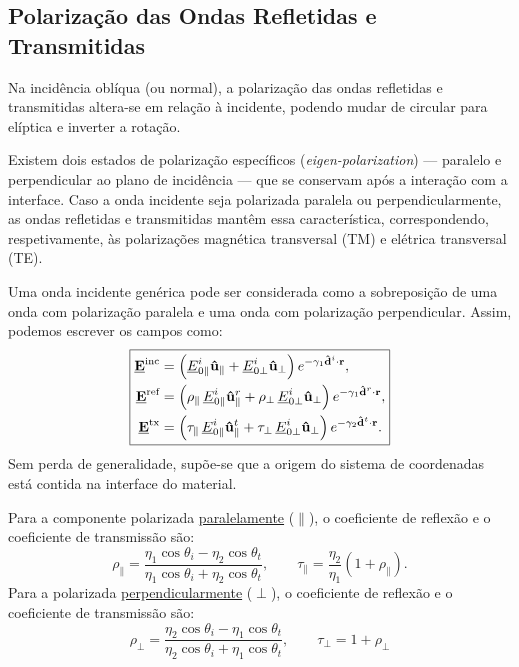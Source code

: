 \subsection{Polarização das Ondas Refletidas e Transmitidas}

Na incidência oblíqua (ou normal), a polarização das ondas refletidas e transmitidas altera-se em relação à incidente, podendo mudar de circular para elíptica e inverter a rotação.

Existem dois estados de polarização específicos (\textit{eigen-polarization}) --- paralelo e perpendicular ao plano de incidência --- que se conservam após a interação com a interface. Caso a onda incidente seja polarizada paralela ou perpendicularmente, as ondas refletidas e transmitidas mantêm essa característica, correspondendo, respetivamente, às polarizações magnética transversal (TM) e elétrica transversal (TE).

Uma onda incidente genérica pode ser considerada como a sobreposição de uma onda com polarização paralela e uma onda com polarização perpendicular. Assim, podemos escrever os campos como:
\begin{equation}
    \boxed{%
        \begin{aligned}
            \mathbf{\underline{E}}^{\text{inc}} &= \left( \underline{E}_{0\parallel}^i \mathbf{\hat{u}}_{\parallel} + \underline{E}_{0\perp}^i \mathbf{\hat{u}}_{\perp} \right) e^{-\gamma_1 \mathbf{\hat{d}}^i \cdot \mathbf{r}}, \\
            \mathbf{\underline{E}}^{\text{ref}} &= \left( \rho_{\parallel}\, \underline{E}_{0\parallel}^i \mathbf{\hat{u}}^{r}_{\parallel} + \rho_{\perp}\, \underline{E}_{0\perp}^i \mathbf{\hat{u}}_{\perp} \right) e^{-\gamma_1 \mathbf{\hat{d}}^r \cdot \mathbf{r}}, \\
            \mathbf{\underline{E}}^{\text{tx}} &= \left( \tau_{\parallel}\, \underline{E}_{0\parallel}^i \mathbf{\hat{u}}^{t}_{\parallel} + \tau_{\perp}\, \underline{E}_{0\perp}^i \mathbf{\hat{u}}_{\perp} \right) e^{-\gamma_2 \mathbf{\hat{d}}^t \cdot \mathbf{r}}.
        \end{aligned}
    }
\end{equation}
Sem perda de generalidade, supõe-se que a origem do sistema de coordenadas está contida na interface do material.

Para a componente polarizada \underline{paralelamente} ($\parallel$), o coeficiente de reflexão e o coeficiente de transmissão são:
\begin{equation}
    \rho_{\parallel} = \frac{\eta_1 \cos \theta_i - \eta_2 \cos \theta_t}{\eta_1 \cos \theta_i + \eta_2 \cos \theta_t},
    \qquad
    \tau_{\parallel} = \frac{\eta_2}{\eta_1} (1 + \rho_{\parallel}).
\end{equation}
Para a polarizada \underline{perpendicularmente} ($\perp$), o coeficiente de reflexão e o coeficiente de transmissão são:
\begin{equation}
    \rho_{\perp} = \frac{\eta_2 \cos \theta_i - \eta_1 \cos \theta_t}{\eta_2 \cos \theta_i + \eta_1 \cos \theta_t},
    \qquad
    \tau_{\perp} = 1 + \rho_{\perp}
\end{equation}

